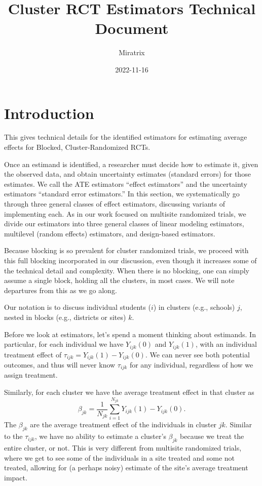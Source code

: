 \documentclass[]{article}
\title{Cluster RCT Estimators Technical Document}
\author{Miratrix}
\date{2022-11-16}
\begin{document}
\maketitle

\section{Introduction}\label{introduction}

This gives technical details for the identified estimators for
estimating average effects for Blocked, Cluster-Randomized RCTs.

Once an estimand is identified, a researcher must decide how to estimate
it, given the observed data, and obtain uncertainty estimates (standard
errors) for those estimates. We call the ATE estimators ``effect
estimators'' and the uncertainty estimators ``standard error
estimators.'' In this section, we systematically go through three
general classes of effect estimators, discussing variants of
implementing each. As in our work focused on multisite randomized
trials, we divide our estimators into three general classes of linear
modeling estimators, multilevel (random effects) estimators, and
design-based estimators.

Because blocking is so prevalent for cluster randomized trials, we
proceed with this full blocking incorporated in our discussion, even
though it increases some of the technical detail and complexity. When
there is no blocking, one can simply assume a single block, holding all
the clusters, in most cases. We will note departures from this as we go
along.

Our notation is to discuss individual students ($i$) in clusters
(e.g., schools) $j$, nested in blocks (e.g., districts or sites) $k$.


Before we look at estimators, let's spend a moment thinking about estimands.
In particular, for each individual we have $Y_{ijk}(0)$ and $Y_{ijk}(1)$, with an individual treatment effect of $\tau_{ijk} = Y_{ijk}(1) - Y_{ijk}(0)$.
We can never see both potential outcomes, and thus will never know $\tau_{ijk}$ for any individual, regardless of how we assign treatment.

Similarly, for each cluster we have the average treatment effect in that cluster as
$$
\beta_{jk} = \frac{1}{N_{jk}} \sum_{i=1}^{N_{jk}} Y_{ijk}(1) - Y_{ijk}(0) .
$$
The $\beta_{jk}$ are the average treatment effect of the individuals in cluster $jk$.
Similar to the $\tau_{ijk}$, we have no ability to estimate a cluster's $\beta_{jk}$ because we treat the entire cluster, or not.
This is very different from multisite randomized trials, where we get to see some of the individuals in a site treated and some not treated, allowing for (a perhaps noisy) estimate of the site's average treatment impact.
\end{document}
